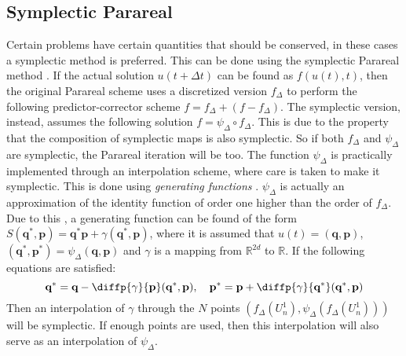 \subsection{Symplectic Parareal}
\label{subsec:intro symplectic parareal}
Certain problems have certain quantities that should be conserved, in these cases a symplectic method is preferred. This can be done using the symplectic Parareal method \cite{bal_symplectic_2008}. If the actual solution $u(t + \Delta t)$ can be found as $f(u(t),t)$, then the original Parareal scheme uses a discretized version $f_{\Delta}$ to perform the following predictor-corrector scheme $f = f_\Delta + (f - f_\Delta)
$. The symplectic version, instead, assumes the following solution $f = \psi_\Delta \circ f_\Delta$. This is due to the property that the composition of symplectic maps is also symplectic. So if both $f_\Delta$ and $\psi_\Delta$ are symplectic, the Parareal iteration will be too. The function $\psi_\Delta$ is practically implemented through an interpolation scheme, where care is taken to make it symplectic. This is done using \textit{generating functions} \cite{hairer_geometric_2006}.  $\psi_\Delta$ is actually an approximation of the identity function of order one higher than the order of $f_{\Delta}$. Due to this \cite{hairer_geometric_2006}, a generating function can be found of the form $S(\textbf{q}^*, \textbf{p}) = \textbf{q}^* \textbf{p} + \gamma(\textbf{q}^*, \textbf{p})$, where it is assumed that $u(t) = (\textbf{q},\textbf{p})$, $(\textbf{q}^*, \textbf{p}^*) = \psi_\Delta(\textbf{q},\textbf{p})$ and $\gamma$ is a mapping from $\mathbb{R}^{2d}$ to $\mathbb{R}$. If the following equations are satisfied:
\[\textbf{q}^* = \textbf{q} - \diffp{\gamma}{{\textbf{p}}}(\textbf{q}^*, \textbf{p}), \quad 
	\textbf{p}^* = \textbf{p} + \diffp{\gamma}{{{\textbf{q}^{*}}}}(\textbf{q}^*, \textbf{p})\]
Then an interpolation of $\gamma$ through the $N$ points $(f_\Delta(U^1_n),\psi_\Delta(f_\Delta(U^1_n)))$ will be symplectic. If enough points are used, then this interpolation will also serve as an interpolation of $\psi_\Delta$\cite{bal_symplectic_2008}.

